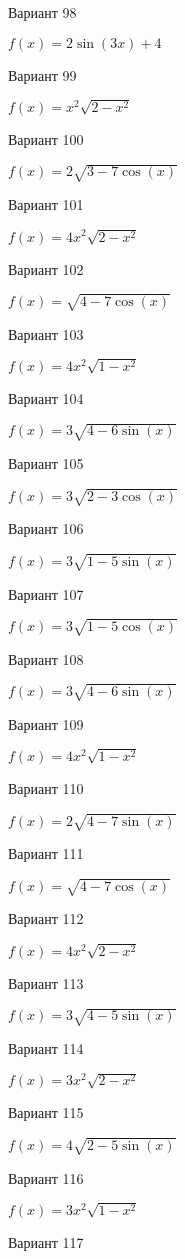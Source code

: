 \documentclass[11pt]{report}
\begin{document}
Вариант 98

$f(x) = 2 \sin{\left(3 x \right)} + 4$

Вариант 99

$f(x) = x^{2} \sqrt{2 - x^{2}}$

Вариант 100

$f(x) = 2 \sqrt{3 - 7 \cos{\left(x \right)}}$

Вариант 101

$f(x) = 4 x^{2} \sqrt{2 - x^{2}}$

Вариант 102

$f(x) = \sqrt{4 - 7 \cos{\left(x \right)}}$

Вариант 103

$f(x) = 4 x^{2} \sqrt{1 - x^{2}}$

Вариант 104

$f(x) = 3 \sqrt{4 - 6 \sin{\left(x \right)}}$

Вариант 105

$f(x) = 3 \sqrt{2 - 3 \cos{\left(x \right)}}$

Вариант 106

$f(x) = 3 \sqrt{1 - 5 \sin{\left(x \right)}}$

Вариант 107

$f(x) = 3 \sqrt{1 - 5 \cos{\left(x \right)}}$

Вариант 108

$f(x) = 3 \sqrt{4 - 6 \sin{\left(x \right)}}$

Вариант 109

$f(x) = 4 x^{2} \sqrt{1 - x^{2}}$

Вариант 110

$f(x) = 2 \sqrt{4 - 7 \sin{\left(x \right)}}$

Вариант 111

$f(x) = \sqrt{4 - 7 \cos{\left(x \right)}}$

Вариант 112

$f(x) = 4 x^{2} \sqrt{2 - x^{2}}$

Вариант 113

$f(x) = 3 \sqrt{4 - 5 \sin{\left(x \right)}}$

Вариант 114

$f(x) = 3 x^{2} \sqrt{2 - x^{2}}$

Вариант 115

$f(x) = 4 \sqrt{2 - 5 \sin{\left(x \right)}}$

Вариант 116

$f(x) = 3 x^{2} \sqrt{1 - x^{2}}$

Вариант 117
\end{document}
